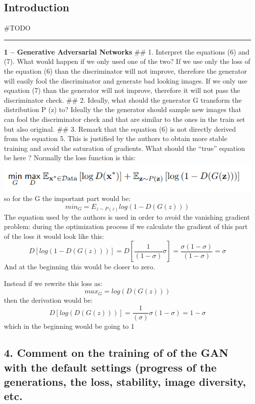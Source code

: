 \hypertarget{introduction}{%
\subsection{Introduction}\label{introduction}}

\#TODO

\begin{center}\rule{0.5\linewidth}{0.5pt}\end{center}

\textbf{1 -- Generative Adversarial Networks} \#\# 1. Interpret the
equations (6) and (7). What would happen if we only used one of the two?
If we use only the loss of the equation (6) than the discriminator will
not improve, therefore the generator will easily fool the discriminator
and generate bad looking images. If we only use equation (7) than the
generator will not improve, therefore it will not pass the discriminator
check. \#\# 2. Ideally, what should the generator G transform the
distribution P (z) to? Ideally the the generator should sample new
images that can fool the discriminator check and that are similar to the
ones in the train set but also original. \#\# 3. Remark that the
equation (6) is not directly derived from the equation 5. This is
justified by the authors to obtain more stable training and avoid the
saturation of gradients. What should the ``true'' equation be here ?
Normally the loss function is this:
\includegraphics{./images/Pasted image 20231213162826.png} so for the G
the important part would be: \[ min_G = E_{z\sim P(z)}log(1-D(G(z)))\]
The equation used by the authors is used in order to avoid the vanishing
gradient problem: during the optimization process if we calculate the
gradient of this part of the loss it would look like this:
\[D[log(1-D(G(z)))] = D[\frac{1}{(1-\sigma)}\sigma] = \frac{\sigma(1-\sigma)}{(1-\sigma)} = \sigma\]
And at the beginning this would be closer to zero.

Instead if we rewrite this loss as: \[max_G = log(D(G(z)))\] then the
derivation would be:
\[D[log(D(G(z)))] = \frac{1}{(\sigma)}\sigma(1-\sigma) = 1 -\sigma\]
which in the beginning would be going to 1

\hypertarget{comment-on-the-training-of-of-the-gan-with-the-default-settings-progress-of-the-generations-the-loss-stability-image-diversity-etc.}{%
\subsection{4. Comment on the training of of the GAN with the default
settings (progress of the generations, the loss, stability, image
diversity,
etc.}\label{comment-on-the-training-of-of-the-gan-with-the-default-settings-progress-of-the-generations-the-loss-stability-image-diversity-etc.}}

